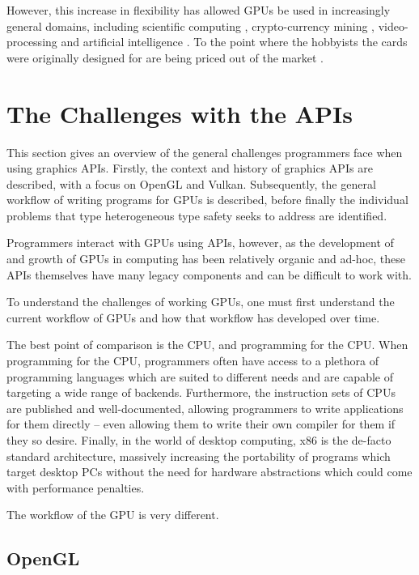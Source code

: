 \documentclass[a4paper,12pt,twoside,openright]{report}
\begin{document}
However, this increase in flexibility has allowed GPUs be used in increasingly
general domains, including scientific computing \cite{TODO}, crypto-currency
mining \cite{TODO}, video-processing \cite{TODO} and artificial intelligence
\cite{TODO}. To the point where the hobbyists the cards were originally
designed for are being priced out of the market \cite{TODO}.

\section{The Challenges with the APIs}

\label{sec:api_challanges}

This section gives an overview of the general challenges programmers face when
using graphics APIs. Firstly, the context and history of graphics APIs are
described, with a focus on OpenGL and Vulkan. Subsequently, the general
workflow of writing programs for GPUs is described, before finally the
individual problems that type heterogeneous type safety seeks to address are
identified.

Programmers interact with GPUs using APIs, however, as the development of and
growth of GPUs in computing has been relatively organic and ad-hoc, these APIs
themselves have many legacy components and can be difficult to work with.

To understand the challenges of working GPUs, one must first understand the
current workflow of GPUs and how that workflow has developed over time.

The best point of comparison is the CPU, and programming for the CPU. When
programming for the CPU, programmers often have access to a plethora of
programming languages which are suited to different needs and are capable of
targeting a wide range of backends. Furthermore, the instruction sets of CPUs
are published and well-documented, allowing programmers to write applications
for them directly -- even allowing them to write their own compiler for them
if they so desire. Finally, in the world of desktop computing, x86 is the
de-facto standard architecture, massively increasing the portability of
programs which target desktop PCs without the need for hardware abstractions
which could come with performance penalties.

The workflow of the GPU is very different.

\subsection{OpenGL}
\end{document}
